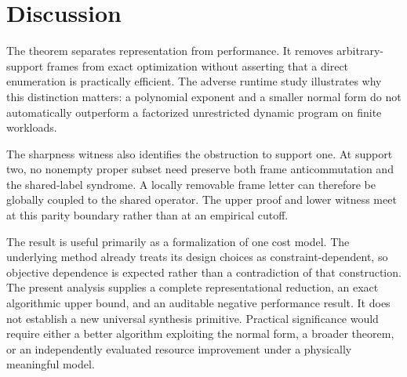 \section{Discussion}

The theorem separates representation from performance. It removes arbitrary-support frames from exact optimization without asserting that a direct enumeration is practically efficient. The adverse runtime study illustrates why this distinction matters: a polynomial exponent and a smaller normal form do not automatically outperform a factorized unrestricted dynamic program on finite workloads.

The sharpness witness also identifies the obstruction to support one. At support two, no nonempty proper subset need preserve both frame anticommutation and the shared-label syndrome. A locally removable frame letter can therefore be globally coupled to the shared operator. The upper proof and lower witness meet at this parity boundary rather than at an empirical cutoff.

The result is useful primarily as a formalization of one cost model. The underlying method already treats its design choices as constraint-dependent, so objective dependence is expected rather than a contradiction of that construction. The present analysis supplies a complete representational reduction, an exact algorithmic upper bound, and an auditable negative performance result. It does not establish a new universal synthesis primitive. Practical significance would require either a better algorithm exploiting the normal form, a broader theorem, or an independently evaluated resource improvement under a physically meaningful model.

